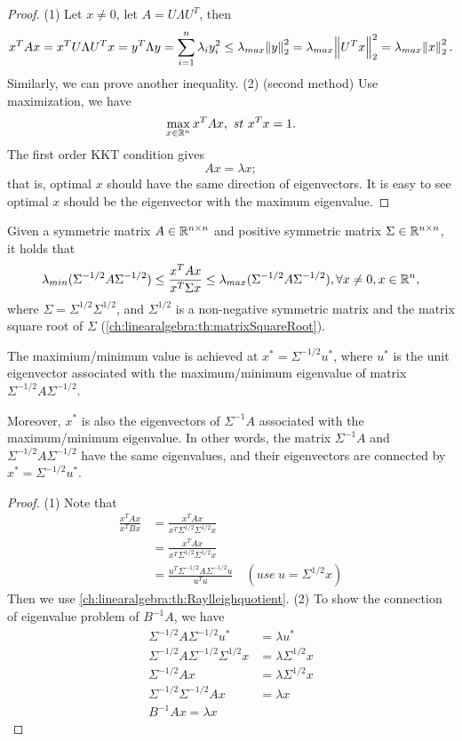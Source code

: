 \begin{refsection}
\begin{proof}
	(1) Let $x\neq 0$, let $A = U\Lambda U^T$, then
	$$x^TAx = x^TU \Lambda U^Tx = y^T\Lambda y = \sum_{i=1}^n \lambda_i y_i^2 \leq \lambda_{max} \norm{y}_2^2 = \lambda_{max} \norm{U^Tx}_2^2 = \lambda_{max} \norm{x}_2^2.$$
	Similarly, we can prove another inequality.
	(2) (second method) Use maximization, we have
	$$\max_{x\in \mathbb{R}^n } x^T A x, ~st~ x^Tx = 1.$$
	The first order KKT condition gives
	$$Ax = \lambda x;$$
	that is, optimal $x$ should have the same direction of eigenvectors. It is easy to see optimal $x$ should be the eigenvector with the maximum eigenvalue. 
\end{proof}

\begin{corollary}\label{ch:linearalgebra:th:GeneralizedRaylleighquotient}
	Given a symmetric matrix $A\in \mathbb{R}^{n\times n}$ and positive symmetric matrix $\Sigma\in \mathbb{R}^{n\times n}$, it holds that 
	$$\lambda_{min}(\Sigma^{-1/2} A\Sigma^{-1/2})\leq \frac{x^TAx}{x^T\Sigma x} \leq \lambda_{max}(\Sigma^{-1/2} A\Sigma^{-1/2}),\forall x\neq 0, x\in \mathbb{R}^n,$$
	where $\Sigma = \Sigma^{1/2}\Sigma^{1/2}$, and $\Sigma^{1/2}$ is a non-negative symmetric matrix and the matrix square root of $\Sigma$ (\autoref{ch:linearalgebra:th:matrixSquareRoot}). 
	
	The maximium/minimum value is achieved at $x^* = \Sigma^{-1/2}u^*$, where $u^*$ is the unit eigenvector associated with the maximum/minimum eigenvalue of matrix $\Sigma^{-1/2} A\Sigma^{-1/2}$.
	
	Moreover, $x^*$ is also the eigenvectors of $\Sigma^{-1}A$ associated with the maximum/minimum eigenvalue. In other words, the matrix $\Sigma^{-1}A$ and $\Sigma^{-1/2} A\Sigma^{-1/2}$ have the same eigenvalues, and their eigenvectors are connected by $x^* = \Sigma^{-1/2}u^*$.
\end{corollary}
\begin{proof}
	(1) Note that	
	\begin{align*}
	\frac{x^TAx}{x^TBx} &= \frac{x^TAx}{x^T\Sigma^{1/2}\Sigma^{1/2}x} \\
	&= \frac{x^TAx}{x^T\Sigma^{1/2}\Sigma^{1/2}x} \\
	&= \frac{u^T\Sigma^{-1/2}A\Sigma^{-1/2}u}{u^Tu} \quad(use~u = \Sigma^{1/2}x) 
	\end{align*}
	Then we use \autoref{ch:linearalgebra:th:Raylleighquotient}.
	(2) To show the connection of eigenvalue problem of $B^{-1}A$, we have
	\begin{align*}
	\Sigma^{-1/2}A\Sigma^{-1/2}u^* &= \lambda u^* \\
	\Sigma^{-1/2}A\Sigma^{-1/2}\Sigma^{1/2}x &= \lambda \Sigma^{1/2}x \\
	\Sigma^{-1/2}Ax &= \lambda \Sigma^{1/2}x \\
	\Sigma^{-1/2}\Sigma^{-1/2}Ax &= \lambda x \\
	B^{-1}Ax = \lambda x
	\end{align*}
\end{proof}



\end{refsection}
